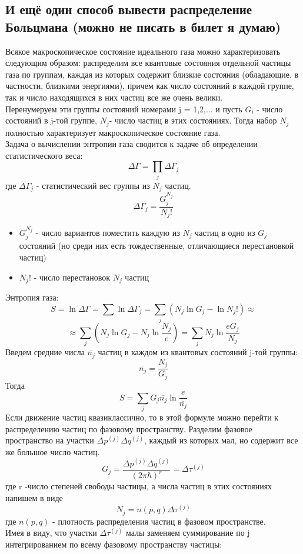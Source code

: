 \subsection{И ещё один способ вывести распределение Больцмана (можно не писать в билет я думаю)}
Всякое макроскопическое состояние идеального газа можно характеризовать следующим образом: распределим все квантовые состояния отдельной частицы газа по группам, каждая из которых содержит близкие состояния (обладающие, в частности, близкими энергиями), причем как число состояний в каждой группе, так и число находящихся в них частиц все же очень велики.\\
Перенумеруем эти группы состояний номерами j = 1,2,... и пусть $G_i$ - число состояний в j-той группе, $N_j$- число частиц в этих состояниях. Тогда набор $N_j$ полностью характеризует макроскопическое состояние газа.\\
Задача о вычислении энтропии газа сводится к задаче об определении статистического веса:
$$
\Delta \Gamma = \prod_{j}\Delta \Gamma_j
$$
где $\Delta \Gamma_j$ - статистический вес группы из $N_j$ частиц.
$$
\Delta \Gamma_j = \frac{G_j^{N_j}}{N_j!}
$$
\begin{itemize}
	\item $G_j^{N_j}$ - число вариантов поместить каждую из $N_j$ частиц в одно из $G_j$ состояний (но среди них есть тождественные, отличающиеся перестановкой частиц)
	\item $N_j!$ - число перестановок $N_j$ частиц
\end{itemize}
Энтропия газа:
$$
S = \ln \Delta \Gamma = \sum\ln \Delta \Gamma_j = \sum_{j}(N_j\ln G_j- \ln N_j!) \approx 
$$
$$
\approx \sum_{j}(N_j\ln G_j- N_j \ln\frac{N_j}{e}) = \sum_{j}N_j\ln\frac{eG_j}{N_j}
$$
Введем средние числа $\overline{n_j}$ частиц в каждом из квантовых состояний j-той группы:
$$
\overline{n_j} = \frac{N_j}{G_j}
$$
Тогда
$$
S = \sum_{j}G_j\overline{n_j} \ln \frac{e}{\overline{n_j}}
$$
Если движение частиц квазиклассично, то в этой формуле можно перейти к распределению частиц по фазовому пространству. Разделим фазовое пространство на участки $\Delta p^{(j)}\Delta q^{(j)}$, каждый из которых мал, но содержит все же большое число частиц.
$$
G_j= \frac{\Delta p^{(j)}\Delta q^{(j)}}{(2\pi\hbar)^r} = \Delta \tau ^{(j)}
$$
где r -число степеней свободы частицы, а числа частиц в этих состояниях напишем в виде 
$$
N_j	= n(p,q)\Delta \tau ^{(j)}
$$
где $n(p,q)$ - плотность распределения частиц в фазовом пространстве.\\
Имея в виду, что участки $\Delta \tau ^{(j)}$ малы заменяем суммирование по j интегрированием по всему фазовому пространству частицы:

